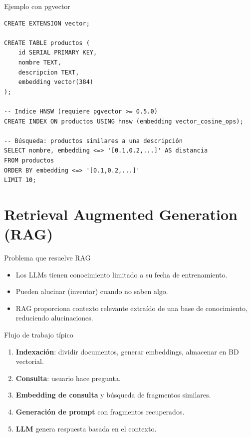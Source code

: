 \documentclass[aspectratio=169, 10pt, xcolor=table]{beamer}
\begin{document}
\begin{frame}[fragile]{Ejemplo con pgvector}
    \begin{lstlisting}[style=mysql]
CREATE EXTENSION vector;

CREATE TABLE productos (
    id SERIAL PRIMARY KEY,
    nombre TEXT,
    descripcion TEXT,
    embedding vector(384)
);

-- Indice HNSW (requiere pgvector >= 0.5.0)
CREATE INDEX ON productos USING hnsw (embedding vector_cosine_ops);

-- Búsqueda: productos similares a una descripción
SELECT nombre, embedding <=> '[0.1,0.2,...]' AS distancia
FROM productos
ORDER BY embedding <=> '[0.1,0.2,...]'
LIMIT 10;
    \end{lstlisting}
\end{frame}

\section{Retrieval Augmented Generation (RAG)}

\begin{frame}{Problema que resuelve RAG}
    \begin{itemize}
        \item Los LLMs tienen conocimiento limitado a su fecha de entrenamiento.
        \item Pueden alucinar (inventar) cuando no saben algo.
        \item RAG proporciona contexto relevante extraído de una base de conocimiento, reduciendo alucinaciones.
    \end{itemize}
\end{frame}

\begin{frame}{Flujo de trabajo típico}
    \begin{enumerate}
        \item \textbf{Indexación}: dividir documentos, generar embeddings, almacenar en BD vectorial.
        \item \textbf{Consulta}: usuario hace pregunta.
        \item \textbf{Embedding de consulta} y búsqueda de fragmentos similares.
        \item \textbf{Generación de prompt} con fragmentos recuperados.
        \item \textbf{LLM} genera respuesta basada en el contexto.
    \end{enumerate}
\end{frame}
\end{document}
